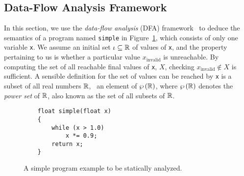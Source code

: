 
\subsection{Data-Flow Analysis Framework}
\label{bg:sub:data_flow}

In this section, we use the \emph{data-flow analysis} (DFA)
framework~\cite{nielson99} to deduce the semantics of a program named
\verb|simple| in Figure~\ref{bg:lst:simple}, which consists of only one
variable \verb|x|.  We assume an initial set $\iota \subseteq \mathbb{R}$ of
values of \verb|x|, and the property pertaining to us is whether a particular
value $x_\mathrm{invalid}$ is unreachable.  By computing the set of all
reachable final values of \verb|x|, $X$, checking $x_\mathrm{invalid} \notin
X$ is sufficient.  A sensible definition for the set of values can be reached
by \verb|x| is a subset of all real numbers $\mathbb{R}$, \ie~an element of
$\wp\left({\mathbb{R}}\right)$, where $\wp\left({\mathbb{R}}\right)$ denotes the \emph{power set}
of $\mathbb{R}$, also known as the set of all subsets of $\mathbb{R}$.
\begin{figure}[ht]
    \centering
    \begin{minipage}{0.5\textwidth}
    \begin{lstlisting}
    float simple(float x)
    {
        while (x > 1.0)
            x *= 0.9;
        return x;
    }
    \end{lstlisting}
    \end{minipage}
    \caption{%
        A simple program example to be statically analyzed.
    }\label{bg:lst:simple}
\end{figure}

